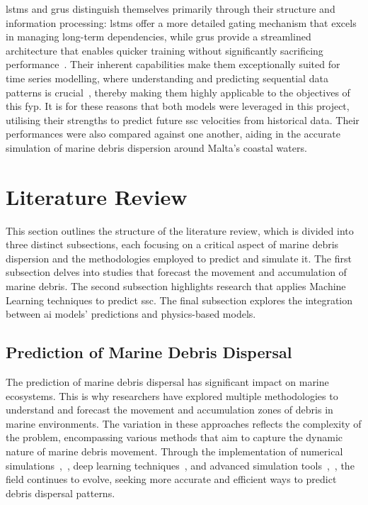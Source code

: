 \acrshort{lstm}s and \acrshort{gru}s distinguish themselves primarily through their structure and information processing: \acrshort{lstm}s offer a more detailed gating mechanism that excels in managing long-term dependencies, while \acrshort{gru}s provide a streamlined architecture that enables quicker training without significantly sacrificing performance~\cite{33}. Their inherent capabilities make them exceptionally suited for time series modelling, where understanding and predicting sequential data patterns is crucial~\cite{29}, thereby making them highly applicable to the objectives of this \acrshort{fyp}. It is for these reasons that both models were leveraged in this project, utilising their strengths to predict future \acrshort{ssc} velocities from historical data. Their performances were also compared against one another, aiding in the accurate simulation of marine debris dispersion around Malta's coastal waters.

 \section{Literature Review}
\label{sec:literature_review}
This section outlines the structure of the literature review, which is divided into three distinct subsections, each focusing on a critical aspect of marine debris dispersion and the methodologies employed to predict and simulate it. The first subsection delves into studies that forecast the movement and accumulation of marine debris. The second subsection highlights research that applies Machine Learning techniques to predict \acrshort{ssc}. The final subsection explores the integration between \acrshort{ai} models' predictions and physics-based models. 

\subsection{Prediction of Marine Debris Dispersal}
\label{subsec:2.2.1}
The prediction of marine debris dispersal has significant impact on marine ecosystems. This is why researchers have explored multiple methodologies to understand and forecast the movement and accumulation zones of debris in marine environments. The variation in these approaches reflects the complexity of the problem, encompassing various methods that aim to capture the dynamic nature of marine debris movement. Through the implementation of numerical simulations~\cite{34},~\cite{35}, deep learning techniques~\cite{36}, and advanced simulation tools~\cite{37},~\cite{38}, the field continues to evolve, seeking more accurate and efficient ways to predict debris dispersal patterns.


